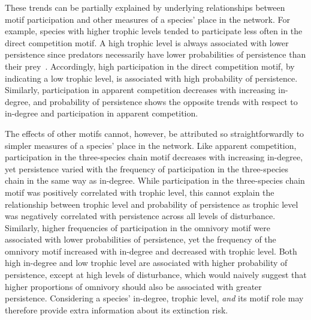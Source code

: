 \documentclass[12pt]{article}
\begin{document}
\begin{spacing}{2.0}
    These trends can be partially explained by underlying relationships between motif participation and other measures of a species' place in the network.
    For example, species with higher trophic levels tended to participate less often in the direct competition motif.
    A high trophic level is always associated with lower persistence since predators necessarily have lower probabilities of persistence than their prey~\citep{Eklof2013}.
    Accordingly, high participation in the direct competition motif, by indicating a low trophic level, is associated with high probability of persistence.
    Similarly, participation in apparent competition decreases with increasing in-degree, and probability of persistence shows the opposite trends with respect to in-degree and participation in apparent competition.

    
    The effects of other motifs cannot, however, be attributed so straightforwardly to simpler measures of a species' place in the network.
    Like apparent competition, participation in the three-species chain motif decreases with increasing in-degree, yet persistence varied with the frequency of participation in the three-species chain in the same way as in-degree.
    While participation in the three-species chain motif was positively correlated with trophic level, this cannot explain the relationship between trophic level and probability of persistence as trophic level was negatively correlated with persistence across all levels of disturbance.
    Similarly, higher frequencies of participation in the omnivory motif were associated with lower probabilities of persistence, yet the frequency of the omnivory motif increased with in-degree and decreased with trophic level.
    Both high in-degree and low trophic level are associated with higher probability of persistence, except at high levels of disturbance, which would naively suggest that higher proportions of omnivory should also be associated with greater persistence. 
    Considering a species' in-degree, trophic level, \emph{and} its motif role may therefore provide extra information about its extinction risk.
    
    
    

\end{spacing}
\end{document}
